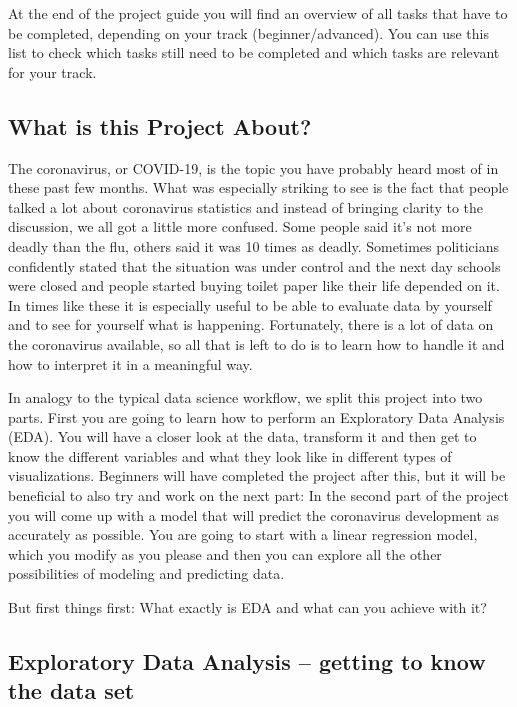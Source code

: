 \documentclass[
  11pt,
]{article}
\begin{document}
At the end of the project guide you will find an overview of all tasks that have to be completed, depending on your track (beginner/advanced). You can use this list to check which tasks still need to be completed and which tasks are relevant for your track.

\hypertarget{what-is-this-project-about}{%
\subsection{What is this Project About?}\label{what-is-this-project-about}}

The coronavirus, or COVID-19, is the topic you have probably heard most of in these past few months. What was especially striking to see is the fact that people talked a lot about coronavirus statistics and instead of bringing clarity to the discussion, we all got a little more confused. Some people said it's not more deadly than the flu, others said it was 10 times as deadly. Sometimes politicians confidently stated that the situation was under control and the next day schools were closed and people started buying toilet paper like their life depended on it. In times like these it is especially useful to be able to evaluate data by yourself and to see for yourself what is happening. Fortunately, there is a lot of data on the coronavirus available, so all that is left to do is to learn how to handle it and how to interpret it in a meaningful way.

In analogy to the typical data science workflow, we split this project into two parts. First you are going to learn how to perform an Exploratory Data Analysis (EDA). You will have a closer look at the data, transform it and then get to know the different variables and what they look like in different types of visualizations. Beginners will have completed the project after this, but it will be beneficial to also try and work on the next part: In the second part of the project you will come up with a model that will predict the coronavirus development as accurately as possible. You are going to start with a linear regression model, which you modify as you please and then you can explore all the other possibilities of modeling and predicting data.

But first things first: What exactly is EDA and what can you achieve with it?

\hypertarget{exploratory-data-analysis-getting-to-know-the-data-set}{%
\subsection{Exploratory Data Analysis -- getting to know the data set}\label{exploratory-data-analysis-getting-to-know-the-data-set}}
\end{document}
